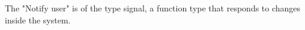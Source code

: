 
The "Notify user" is of the type signal, a function type that responds to changes inside the system.







